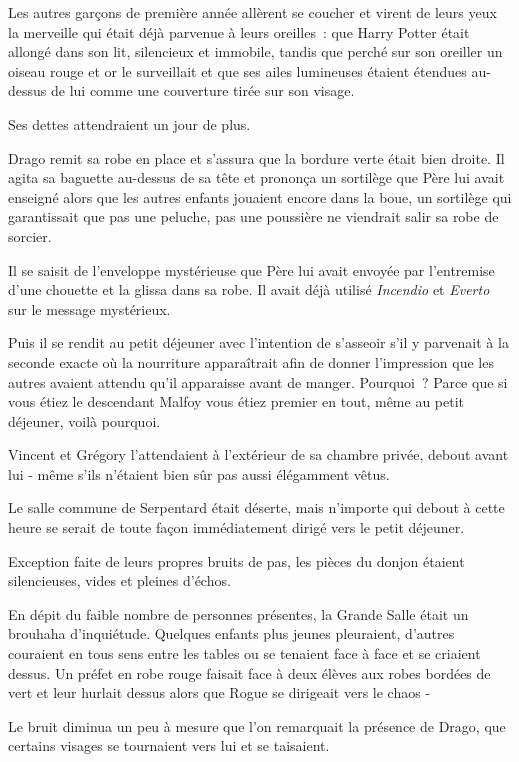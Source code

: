 Les autres garçons de première année allèrent se coucher et virent de leurs yeux la merveille qui était déjà parvenue à leurs oreilles~: que Harry Potter était allongé dans son lit, silencieux et immobile, tandis que perché sur son oreiller un oiseau rouge et or le surveillait et que ses ailes lumineuses étaient étendues au-dessus de lui comme une couverture tirée sur son visage.

Ses dettes attendraient un jour de plus.


Drago remit sa robe en place et s'assura que la bordure verte était bien droite. Il agita sa baguette au-dessus de sa tête et prononça un sortilège que Père lui avait enseigné alors que les autres enfants jouaient encore dans la boue, un sortilège qui garantissait que pas une peluche, pas une poussière ne viendrait salir sa robe de sorcier.

Il se saisit de l'enveloppe mystérieuse que Père lui avait envoyée par l'entremise d'une chouette et la glissa dans sa robe. Il avait déjà utilisé \emph{Incendio} et \emph{Everto} sur le message mystérieux.

Puis il se rendit au petit déjeuner avec l'intention de s'asseoir s'il y parvenait à la seconde exacte où la nourriture apparaîtrait afin de donner l'impression que les autres avaient attendu qu'il apparaisse avant de manger. Pourquoi~? Parce que si vous étiez le descendant Malfoy vous étiez premier en tout, même au petit déjeuner, voilà pourquoi.

Vincent et Grégory l'attendaient à l'extérieur de sa chambre privée, debout avant lui - même s'ils n'étaient bien sûr pas aussi élégamment vêtus.

Le salle commune de Serpentard était déserte, mais n'importe qui debout à cette heure se serait de toute façon immédiatement dirigé vers le petit déjeuner.

Exception faite de leurs propres bruits de pas, les pièces du donjon étaient silencieuses, vides et pleines d'échos.

En dépit du faible nombre de personnes présentes, la Grande Salle était un brouhaha d'inquiétude. Quelques enfants plus jeunes pleuraient, d'autres couraient en tous sens entre les tables ou se tenaient face à face et se criaient dessus. Un préfet en robe rouge faisait face à deux élèves aux robes bordées de vert et leur hurlait dessus alors que Rogue se dirigeait vers le chaos -

Le bruit diminua un peu à mesure que l'on remarquait la présence de Drago, que certains visages se tournaient vers lui et se taisaient.


